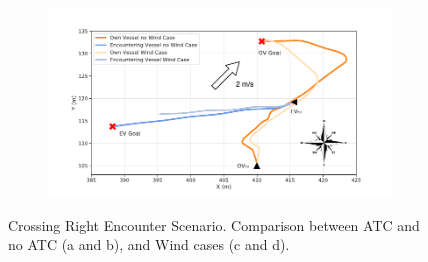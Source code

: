         \begin{figure}[H]
        \centering
        
            \begin{subfigure}[b]{0.49\textwidth}
                \centering
                
                \caption{}
                \label{fig:plot_cr_w_vs_wo}
            \end{subfigure}
            \begin{subfigure}[b]{0.49\textwidth}
                \centering
                
                \caption{}
                \label{fig:plot_cr_w_vs_wo_CT}
            \end{subfigure}
            
            \begin{subfigure}[b]{0.49\textwidth}
                \centering
                \includegraphics[width=\textwidth]{figs/Chap5/plot_cr_w_vs_wind.pdf}
                \caption{}
                \label{fig:plot_cr_w_vs_wind}
            \end{subfigure}
            \begin{subfigure}[b]{0.49\textwidth}
                \centering
                
                \caption{}
                \label{fig:plot_cr_w_vs_wind_CT}
            \end{subfigure}
        
        \caption{Crossing Right Encounter Scenario. Comparison between \ac{ATC} and no \ac{ATC} (a and b), and Wind cases (c and d).}
        \label{fig:plots_cr}
        \end{figure}
        
